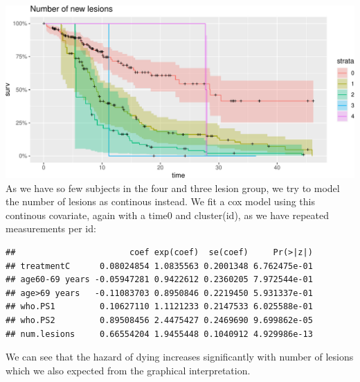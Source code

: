 \documentclass[
  11pt,
]{article}
\newenvironment{Shaded}{\begin{snugshade}}{\end{snugshade}}
\newcommand{\AttributeTok}[1]{\textcolor[rgb]{0.77,0.63,0.00}{#1}}
\newcommand{\DecValTok}[1]{\textcolor[rgb]{0.00,0.00,0.81}{#1}}
\newcommand{\FloatTok}[1]{\textcolor[rgb]{0.00,0.00,0.81}{#1}}
\newcommand{\FunctionTok}[1]{\textcolor[rgb]{0.00,0.00,0.00}{#1}}
\newcommand{\NormalTok}[1]{#1}
\newcommand{\OtherTok}[1]{\textcolor[rgb]{0.56,0.35,0.01}{#1}}
\newcommand{\SpecialCharTok}[1]{\textcolor[rgb]{0.00,0.00,0.00}{#1}}
\begin{document}
\includegraphics{Exam2021_PracticalPart_files/figure-latex/unnamed-chunk-12-1.pdf}
As we have so few subjects in the four and three lesion group, we try to
model the number of lesions as continous instead. We fit a cox model
using this continous covariate, again with a time0 and cluster(id), as
we have repeated measurements per id:

\begin{Shaded}
\end{Shaded}

\begin{verbatim}
##                       coef exp(coef)  se(coef)     Pr(>|z|)
## treatmentC      0.08024854 1.0835563 0.2001348 6.762475e-01
## age60-69 years -0.05947281 0.9422612 0.2360205 7.972544e-01
## age>69 years   -0.11083703 0.8950846 0.2219450 5.931337e-01
## who.PS1         0.10627110 1.1121233 0.2147533 6.025588e-01
## who.PS2         0.89508456 2.4475427 0.2469690 9.699862e-05
## num.lesions     0.66554204 1.9455448 0.1040912 4.929986e-13
\end{verbatim}

We can see that the hazard of dying increases significantly with number
of lesions which we also expected from the graphical interpretation.
\end{document}
